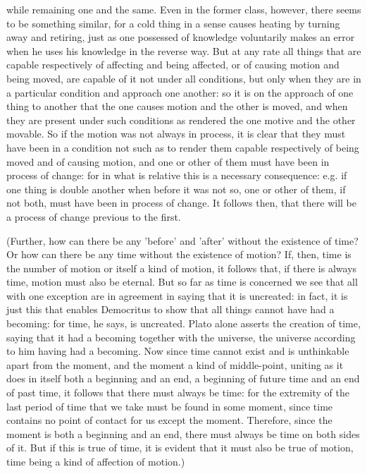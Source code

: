 while remaining one and the same. Even in the former class, however,
there seems to be something similar, for a cold thing in a sense causes
heating by turning away and retiring, just as one possessed of knowledge
voluntarily makes an error when he uses his knowledge in the reverse
way. But at any rate all things that are capable respectively of affecting
and being affected, or of causing motion and being moved, are capable
of it not under all conditions, but only when they are in a particular
condition and approach one another: so it is on the approach of one
thing to another that the one causes motion and the other is moved,
and when they are present under such conditions as rendered the one
motive and the other movable. So if the motion was not always in process,
it is clear that they must have been in a condition not such as to
render them capable respectively of being moved and of causing motion,
and one or other of them must have been in process of change: for
in what is relative this is a necessary consequence: e.g. if one thing
is double another when before it was not so, one or other of them,
if not both, must have been in process of change. It follows then,
that there will be a process of change previous to the first.

(Further, how can there be any 'before' and 'after' without the existence
of time? Or how can there be any time without the existence of motion?
If, then, time is the number of motion or itself a kind of motion,
it follows that, if there is always time, motion must also be eternal.
But so far as time is concerned we see that all with one exception
are in agreement in saying that it is uncreated: in fact, it is just
this that enables Democritus to show that all things cannot have had
a becoming: for time, he says, is uncreated. Plato alone asserts the
creation of time, saying that it had a becoming together with the
universe, the universe according to him having had a becoming. Now
since time cannot exist and is unthinkable apart from the moment,
and the moment a kind of middle-point, uniting as it does in itself
both a beginning and an end, a beginning of future time and an end
of past time, it follows that there must always be time: for the extremity
of the last period of time that we take must be found in some moment,
since time contains no point of contact for us except the moment.
Therefore, since the moment is both a beginning and an end, there
must always be time on both sides of it. But if this is true of time,
it is evident that it must also be true of motion, time being a kind
of affection of motion.) 

